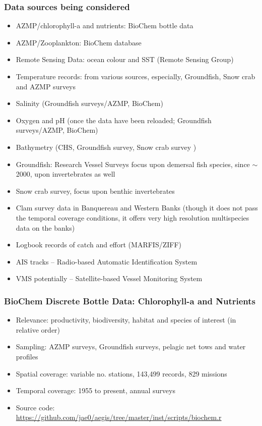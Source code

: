 \documentclass{beamer}
\numberwithin{figure}{section}		%
\numberwithin{table}{section}				%
\begin{document}
\begin{frame}[shrink]
  \frametitle{Data sources being considered}
\begin{itemize}
	\item AZMP/chlorophyll-a and nutrients: BioChem bottle data
  \item AZMP/Zooplankton: BioChem database
  \item Remote Sensing Data: ocean colour and SST (Remote Sensing Group)
  \item Temperature records: from various sources, especially, Groundfish, Snow crab and AZMP surveys
  \item Salinity (Groundfish surveys/AZMP, BioChem)
  \item Oxygen and pH (once the data have been reloaded; Groundfish surveys/AZMP, BioChem)
  \item Bathymetry (CHS, Groundfish survey, Snow crab survey )
  \item Groundfish: Research Vessel Surveys focus upon demersal fish species, since $\sim$ 2000, upon invertebrates as well
  \item Snow crab survey, focus upon benthic invertebrates
  \item Clam survey data in Banquereau and Western Banks (though it does not pass the temporal coverage conditions, it offers very high resolution multispecies data on the banks)
  \item Logbook records of catch and effort (MARFIS/ZIFF)
  \item AIS tracks -- Radio-based Automatic Identification System
  \item VMS potentially -- Satellite-based Vessel Monitoring System
\end{itemize}

\end{frame}



\begin{frame}
  \frametitle{BioChem Discrete Bottle Data: Chlorophyll-a and Nutrients}
\begin{itemize}
  \item Relevance: productivity, biodiversity, habitat and species of interest (in relative order)
  \item Sampling: AZMP surveys, Groundfish surveys, pelagic net tows and water profiles
  \item Spatial coverage: variable no. stations, 143,499 records, 829 missions
  \item Temporal coverage: 1955 to present, annual surveys
  \item Source code: \url{https://github.com/jae0/aegis/tree/master/inst/scripts/biochem.r}
\end{itemize}
\end{frame}
\end{document}
